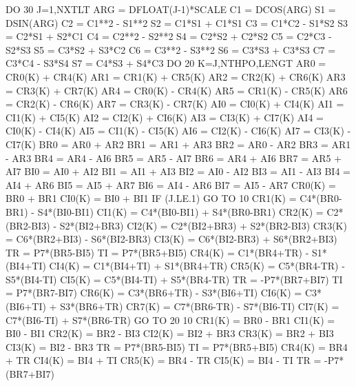       DO 30 J=1,NXTLT
        ARG = DFLOAT(J-1)*SCALE
        C1 = DCOS(ARG)
        S1 = DSIN(ARG)
        C2 = C1**2 - S1**2
        S2 = C1*S1 + C1*S1
        C3 = C1*C2 - S1*S2
        S3 = C2*S1 + S2*C1
        C4 = C2**2 - S2**2
        S4 = C2*S2 + C2*S2
        C5 = C2*C3 - S2*S3
        S5 = C3*S2 + S3*C2
        C6 = C3**2 - S3**2
        S6 = C3*S3 + C3*S3
        C7 = C3*C4 - S3*S4
        S7 = C4*S3 + S4*C3
        DO 20 K=J,NTHPO,LENGT
          AR0 = CR0(K) + CR4(K)
          AR1 = CR1(K) + CR5(K)
          AR2 = CR2(K) + CR6(K)
          AR3 = CR3(K) + CR7(K)
          AR4 = CR0(K) - CR4(K)
          AR5 = CR1(K) - CR5(K)
          AR6 = CR2(K) - CR6(K)
          AR7 = CR3(K) - CR7(K)
          AI0 = CI0(K) + CI4(K)
          AI1 = CI1(K) + CI5(K)
          AI2 = CI2(K) + CI6(K)
          AI3 = CI3(K) + CI7(K)
          AI4 = CI0(K) - CI4(K)
          AI5 = CI1(K) - CI5(K)
          AI6 = CI2(K) - CI6(K)
          AI7 = CI3(K) - CI7(K)
          BR0 = AR0 + AR2
          BR1 = AR1 + AR3
          BR2 = AR0 - AR2
          BR3 = AR1 - AR3
          BR4 = AR4 - AI6
          BR5 = AR5 - AI7
          BR6 = AR4 + AI6
          BR7 = AR5 + AI7
          BI0 = AI0 + AI2
          BI1 = AI1 + AI3
          BI2 = AI0 - AI2
          BI3 = AI1 - AI3
          BI4 = AI4 + AR6
          BI5 = AI5 + AR7
          BI6 = AI4 - AR6
          BI7 = AI5 - AR7
          CR0(K) = BR0 + BR1
          CI0(K) = BI0 + BI1
          IF (J.LE.1) GO TO 10
          CR1(K) = C4*(BR0-BR1) - S4*(BI0-BI1)
          CI1(K) = C4*(BI0-BI1) + S4*(BR0-BR1)
          CR2(K) = C2*(BR2-BI3) - S2*(BI2+BR3)
          CI2(K) = C2*(BI2+BR3) + S2*(BR2-BI3)
          CR3(K) = C6*(BR2+BI3) - S6*(BI2-BR3)
          CI3(K) = C6*(BI2-BR3) + S6*(BR2+BI3)
          TR = P7*(BR5-BI5)
          TI = P7*(BR5+BI5)
          CR4(K) = C1*(BR4+TR) - S1*(BI4+TI)
          CI4(K) = C1*(BI4+TI) + S1*(BR4+TR)
          CR5(K) = C5*(BR4-TR) - S5*(BI4-TI)
          CI5(K) = C5*(BI4-TI) + S5*(BR4-TR)
          TR = -P7*(BR7+BI7)
          TI = P7*(BR7-BI7)
          CR6(K) = C3*(BR6+TR) - S3*(BI6+TI)
          CI6(K) = C3*(BI6+TI) + S3*(BR6+TR)
          CR7(K) = C7*(BR6-TR) - S7*(BI6-TI)
          CI7(K) = C7*(BI6-TI) + S7*(BR6-TR)
          GO TO 20
 10       CR1(K) = BR0 - BR1
          CI1(K) = BI0 - BI1
          CR2(K) = BR2 - BI3
          CI2(K) = BI2 + BR3
          CR3(K) = BR2 + BI3
          CI3(K) = BI2 - BR3
          TR = P7*(BR5-BI5)
          TI = P7*(BR5+BI5)
          CR4(K) = BR4 + TR
          CI4(K) = BI4 + TI
          CR5(K) = BR4 - TR
          CI5(K) = BI4 - TI
          TR = -P7*(BR7+BI7)

